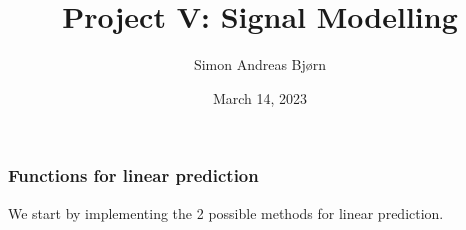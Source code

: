 \documentclass[compress,aspectratio=169]{beamer}
\title{Project V: Signal Modelling}
\subtitle{}
\author{\large Simon Andreas Bjørn}
\date{\large March 14, 2023}
\begin{document}
\begin{frame}
    \maketitle
\end{frame}

\begin{frame} %
    \frametitle{Functions for linear prediction}
    We start by implementing the 2 possible methods for linear prediction.

    \begin{jllisting}[gobble=8]
        
    \end{jllisting} 
\end{frame} %
\end{document}

